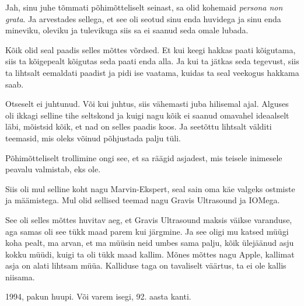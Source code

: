
Jah, sinu juhe tõmmati põhimõtteliselt seinast,  sa olid kohemaid \emph{persona 
non grata}. Ja arvestades sellega, et see oli seotud sinu enda huvidega ja sinu 
enda mineviku, oleviku ja tulevikuga siis sa ei saanud seda omale lubada.


Kõik olid seal paadis selles mõttes võrdsed. Et kui keegi hakkas paati 
kõigutama, siis ta kõigepealt kõigutas seda paati enda alla. Ja kui ta jätkas 
seda tegevust, siis ta lihtsalt eemaldati paadist ja pidi ise vaatama, kuidas 
ta seal veekogus hakkama saab.


Otseselt ei juhtunud. Või kui juhtus, siis vähemasti juba hilisemal ajal. 
Alguses oli ikkagi selline tihe seltskond ja kuigi nagu kõik ei saanud omavahel 
ideaalselt läbi, mõistsid kõik, et nad on selles paadis  koos. Ja seetõttu 
lihtsalt välditi teemasid, mis oleks võinud põhjustada palju tüli.


Põhimõtteliselt trollimine ongi see, et sa räägid asjadest, mis teisele 
inimesele peavalu valmistab, eks ole.
                 

Siis oli mul selline koht nagu Marvin-Ekspert, seal sain oma käe valgeks 
ostmiste ja määmistega. Mul olid sellised teemad nagu Gravis Ultrasound ja 
IOMega.

See oli selles mõttes huvitav aeg, et Gravis Ultrasound maksis väikse 
varanduse, aga samas oli see tükk maad parem kui järgmine. Ja see oligi mu 
katsed müügi koha pealt, ma arvan, et ma müüsin neid umbes sama palju, kõik 
ülejäänud asju kokku müüdi, kuigi ta oli tükk maad kallim. Mõnes mõttes nagu 
Apple, kallimat asja on alati lihtsam müüa. Kalliduse taga on tavaliselt 
väärtus, ta ei ole kallis niisama.


1994, pakun huupi. Või varem isegi, 92. aasta kanti.


